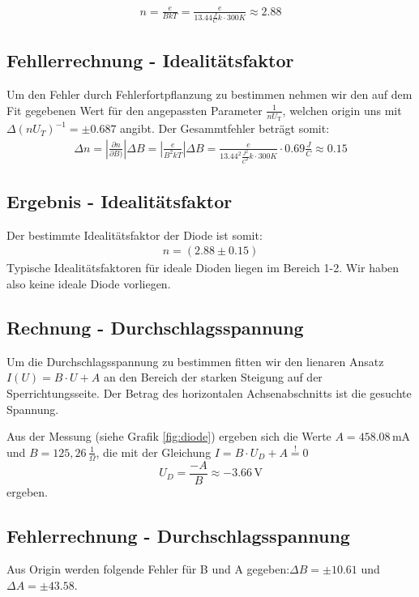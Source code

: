 \begin{eqnarray}
    n=\frac{e}{BkT}=\frac{e}{13.44\frac{J}{C}k\cdot300K}\approx2.88
\end{eqnarray}

\subsection*{Fehllerrechnung - Idealitätsfaktor}
Um den Fehler durch Fehlerfortpflanzung zu bestimmen nehmen wir den auf dem Fit gegebenen Wert für den angepassten Parameter $\frac{1}{nU_\text{T}}$, welchen origin uns mit $\Delta(n U_T)^{-1}=\pm 0.687$ angibt.
Der Gesammtfehler beträgt somit:
\begin{eqnarray}
    \Delta n = \left|\frac{\partial n}{\partial B)}\right|\Delta B= \left|\frac{e}{B^2kT}\right| \Delta B=\frac{e}{13.44^2\frac{J^2}{C^2}k\cdot300K}\cdot0.69\frac{J}{C}\approx0.15
\end{eqnarray}

\subsection*{Ergebnis - Idealitätsfaktor}
Der bestimmte Idealitätsfaktor der Diode ist somit:
\begin{eqnarray}
    n = (2.88\pm0.15)
\end{eqnarray}
Typische Idealitätsfaktoren für ideale Dioden liegen im Bereich 1-2. Wir haben also keine ideale Diode vorliegen.

\subsection*{Rechnung - Durchschlagsspannung}
Um die Durchschlagsspannung zu bestimmen fitten wir den lienaren Ansatz $I(U)=B\cdot U + A$ an den Bereich der starken Steigung auf der Sperrichtungsseite. Der Betrag des horizontalen Achsenabschnitts ist die gesuchte Spannung. 

Aus der Messung (siehe Grafik \ref{fig:diode}) ergeben sich die Werte $A=458.08$\,mA und $B=125,26\,\frac{1}{\Omega}$, die mit der Gleichung $I=B \cdot U_D + A \stackrel{!}{=} 0$ 
$$U_D = \frac{-A}{B}  \approx -3.66\,\mathrm{V}$$ ergeben.

\subsection*{Fehlerrechnung - Durchschlagsspannung}

Aus Origin werden folgende Fehler für B und A gegeben:$\Delta B = \pm 10.61$ und $\Delta A = \pm43.58$.

